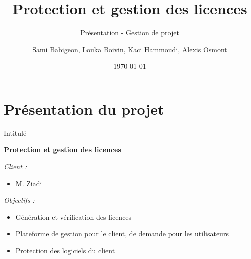 \documentclass{cubeamer}
\title{Protection et gestion des licences}
\subtitle{Présentation - Gestion de projet}
\author{Sami Babigeon, Louka Boivin, Kaci Hammoudi, Alexis Osmont}
\date{\today}
\institute[Université de Rouen]{Master Informatique - 1ère année}
\begin{document}
\maketitle
\cutoc

%
%



\section{Présentation du projet}

\begin{frame}{Intitulé}
    \centerline{\textbf{Protection et gestion des licences}}
    \medskip
    \emph{Client :}
    \begin{itemize}
        \item M. Ziadi
    \end{itemize}
    \emph{Objectifs :}
    \begin{itemize}
        \item Génération et vérification des licences
        \item Plateforme de gestion pour le client, de demande pour les utilisateurs
        \item Protection des logiciels du client
    \end{itemize}
\end{frame}
\end{document}
